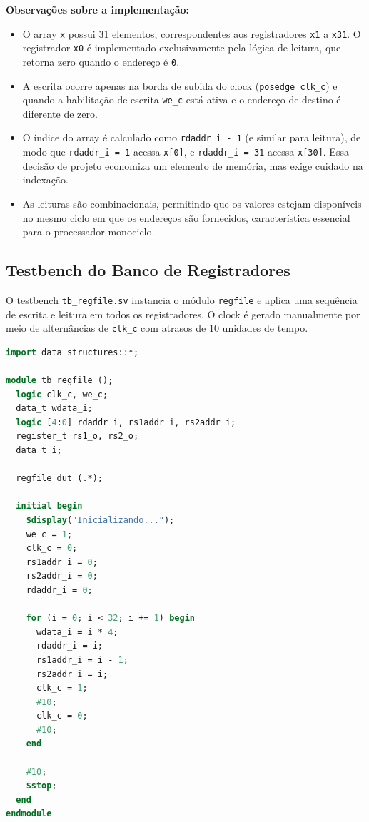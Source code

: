 \documentclass[
	12pt,				%
	oneside,
	a4paper,			%
	english,			%
	french,				%
	spanish,			%
	brazil,				%
	]{abntex2}
\begin{document}
\textbf{Observações sobre a implementação:}
\begin{itemize}
  \item O array \texttt{x} possui 31 elementos, correspondentes aos registradores \texttt{x1} a \texttt{x31}. O registrador \texttt{x0} é implementado exclusivamente pela lógica de leitura, que retorna zero quando o endereço é \texttt{0}.
  \item A escrita ocorre apenas na borda de subida do clock (\texttt{posedge clk\_c}) e quando a habilitação de escrita \texttt{we\_c} está ativa e o endereço de destino é diferente de zero.
  \item O índice do array é calculado como \texttt{rdaddr\_i - 1} (e similar para leitura), de modo que \texttt{rdaddr\_i = 1} acessa \texttt{x[0]}, e \texttt{rdaddr\_i = 31} acessa \texttt{x[30]}. Essa decisão de projeto economiza um elemento de memória, mas exige cuidado na indexação.
  \item As leituras são combinacionais, permitindo que os valores estejam disponíveis no mesmo ciclo em que os endereços são fornecidos, característica essencial para o processador monociclo.
\end{itemize}

\subsection{Testbench do Banco de Registradores}

O testbench \texttt{tb\_regfile.sv} instancia o módulo \texttt{regfile} e aplica uma sequência de escrita e leitura em todos os registradores. O clock é gerado manualmente por meio de alternâncias de \texttt{clk\_c} com atrasos de 10 unidades de tempo.

\begin{lstlisting}[language=SystemVerilog, caption={Testbench tb\_regfile.sv}, label={lst:tb_regfile}]
import data_structures::*;

module tb_regfile ();
  logic clk_c, we_c;
  data_t wdata_i;
  logic [4:0] rdaddr_i, rs1addr_i, rs2addr_i;
  register_t rs1_o, rs2_o;
  data_t i;

  regfile dut (.*);

  initial begin
    $display("Inicializando...");
    we_c = 1;
    clk_c = 0;
    rs1addr_i = 0;
    rs2addr_i = 0;
    rdaddr_i = 0;

    for (i = 0; i < 32; i += 1) begin
      wdata_i = i * 4;
      rdaddr_i = i;
      rs1addr_i = i - 1;
      rs2addr_i = i;
      clk_c = 1;
      #10;
      clk_c = 0;
      #10;
    end

    #10;
    $stop;
  end
endmodule
\end{lstlisting}
\end{document}
